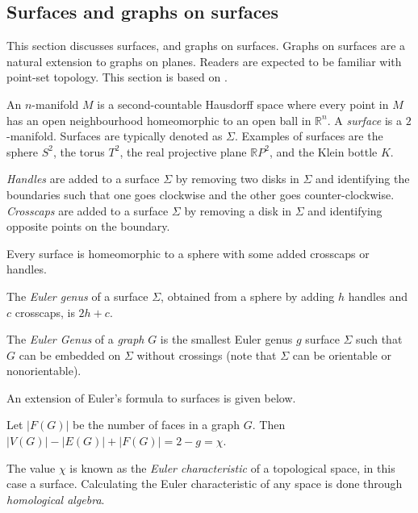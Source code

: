\subsection{Surfaces and graphs on surfaces}
This section discusses surfaces, and graphs on surfaces. Graphs on surfaces are a natural extension to graphs on planes. Readers are expected to be familiar with point-set topology. This section is based on \textcite{moharGraphsSurfaces2001}.

An $n$-manifold $M$ is a second-countable Hausdorff space where every point in $M$ has an open neighbourhood homeomorphic to an open ball in $\mathbb{R}^n$.  
A \textit{surface} is a $2$-manifold. Surfaces are typically denoted as $\Sigma$. Examples of surfaces are the sphere $S^2$, the torus $T^2$, the real projective plane $\mathbb{R}P^2$, and the Klein bottle $K$. 

\textit{Handles} are added to a surface \(\Sigma\) by removing two disks in \(\Sigma\) and identifying the boundaries such that one goes clockwise and the other goes counter-clockwise. \textit{Crosscaps} are added to a surface $\Sigma$ by removing a disk in \(\Sigma\) and identifying opposite points on the boundary. 

\begin{theorem}
	Every surface is homeomorphic to a sphere with some added crosscaps or handles. 
\end{theorem}

\begin{definition}
	The \textit{Euler genus} of a surface \(\Sigma\), obtained from a sphere by adding \(h\) handles and \(c\) crosscaps, is \(2h + c\).
\end{definition}

The \textit{Euler Genus} of a \textit{graph} \(G\) is the smallest Euler genus \(g\) surface \(\Sigma\) such that \(G\) can be embedded on \(\Sigma\) without crossings (note that \(\Sigma\) can be orientable or nonorientable). 

An extension of Euler's formula to surfaces is given below. 
\begin{theorem}\label{thm:Euler_surfaces}
	Let \(|F(G)|\) be the number of faces in a graph \(G\). Then \(|V(G)| - |E(G)| + |F(G)| = 2 - g = \chi\). 
\end{theorem}
The value $\chi$ is known as the \textit{Euler characteristic} of a topological space, in this case a surface. Calculating the Euler characteristic of any space is done through \textit{homological algebra}. 

